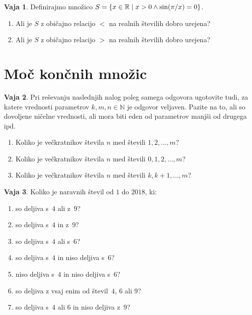 \documentclass{article}
\newcommand{\NN}{\mathbb{N}}
\newcommand{\RR}{\mathbb{R}}
\theoremstyle{definition}
\newtheorem{vaja}{Vaja}
\begin{document}
\begin{vaja}
  Definirajmo množico $S = \set{x \in \RR}{x > 0 \land \sin(\pi/x) = 0}$.
  \begin{enumerate}
    \item Ali je $S$ z običajno relacijo $<$ na realnih številih dobro urejena?
    \item Ali je $S$ z običajno relacijo $>$ na realnih številih dobro urejena?
  \end{enumerate}
\end{vaja}

\pagebreak

\section{Moč končnih množic}

\begin{vaja}
  Pri reševanju naslednjih nalog poleg samega odgovora ugotovite tudi, za katere vrednosti parametrov $k, m, n \in \NN$ je odgovor veljaven. Pazite na to, ali so dovoljene ničelne vrednosti, ali mora biti eden od parametrov manjši od drugega ipd.
  \begin{enumerate}
    \item
      Koliko je večkratnikov števila $n$ med števili $1, 2, \ldots, m$?
    \item
      Koliko je večkratnikov števila $n$ med števili $0, 1, 2, \ldots, m$?
    \item
      Koliko je večkratnikov števila $n$ med števili $k, k+1, \ldots, m$?
  \end{enumerate}
\end{vaja}

\begin{vaja}
  Koliko je naravnih števil od $1$ do $2018$, ki:
  \begin{enumerate}
    \item
      so deljiva s~$4$ ali z~$9$?
    \item
      so deljiva s~$4$ in z~$9$?
    \item
      so deljiva s~$4$ ali s~$6$?
    \item
      so deljiva s~$4$ in niso deljiva s~$6$?
    \item
      niso deljiva s~$4$ in niso deljiva s~$6$?
    \item
      so deljiva z vsaj enim od števil~$4$, $6$ ali $9$?
    \item
      so deljiva s~$4$ ali $6$ in niso deljiva z~$9$?
  \end{enumerate}
\end{vaja}
\end{document}
